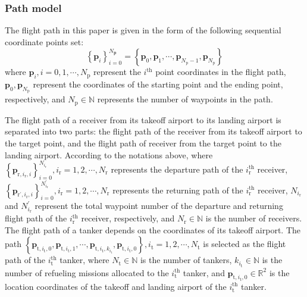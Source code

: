 \subsubsection{Path model}
The flight path in this paper is given in the form of the following sequential coordinate points set:
\begin{equation}
\left\{\mathbf{p}_i\right\}_{i=0}^{N_{\mathbf{p}}}=\left\{\mathbf{p}_{0},\mathbf{\textbf{p}}_{1},\cdots,\mathbf{p}_{N_{\text{p}}-1},\mathbf{p}_{N_{\text{p}}}\right\}
\label{eq:15.11}
\end{equation}	 
where $\mathbf{p}_{i},i=0,1,\cdots,N_{\text{p}}$ represent the $i^{\text{th}}$ point coordinates in the flight path, $\mathbf{p}_{0},\mathbf{p}_{N_\text{p}}$ represent the coordinates of the starting point and the ending point, respectively, and $N_\text{p}\in\mathbb{N}$ represents the number of waypoints in the path.

The flight path of a receiver from its takeoff airport to its landing airport is separated into two parts: the flight path of the receiver from its takeoff airport to the target point, and the flight path of receiver from the target point to the landing airport. According to the notations above, where  $\left\{\mathbf{p}_{\text{r},i_\text{r},i}\right\}_{i=0}^{N_{i_\text{r}}},{i}_{\text{r}}=1,2,\cdots,N_{\text{r}}$  represents the departure path of the $i_{\text{r}}^{\text{th}}$ receiver,  $\left\{\mathbf{p}_{\text{r}^{'},i_\text{r},i}\right\}_{i=0}^{N_{i_\text{r}}^{'}},{i}_{\text{r}}=1,2,\cdots,N_{\text{r}}$  represents the returning path of the $i_{\text{r}}^{\text{th}}$  receiver, $N_{i_\text{r}}$  and $N_{i_\text{r}}^{'}$  represent the total waypoint number of the departure and returning flight path of the  $i_{\text{r}}^{\text{th}}$  receiver, respectively, and  $N_\text{r}\in\mathbb{N}$ is the number of receivers. The flight path of a tanker depends on the coordinates of its takeoff airport. The path $\left\{\mathbf{p}_{\text{t},i_{\text{t}},0},\mathbf{p}_{\text{t},i_{\text{t}},1},\cdots,\mathbf{p}_{\text{t},i_{\text{t}},k_{i_{\text{t}}}},\mathbf{p}_{\text{t},i_{\text{t}},0}\right\},i_{\text{t}}=1,2,\cdots,N_{\text{t}}$  is selected as the flight path of the $i_{\text{t}}^{\text{th}}$  tanker, where $N_\text{t}\in\mathbb{N}$  is the number of tankers, $k_{i_\text{t}}\in\mathbb{N}$  is the number of refueling missions allocated to the $i_{\text{t}}^{\text{th}}$  tanker, and $\mathbf{p}_{\text{t},i_{\text{t}},0}\in\mathbb{R}^{2}$  is the location coordinates of the takeoff and landing airport of the $i_{\text{t}}^{\text{th}}$ tanker.


